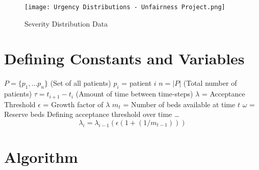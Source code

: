 \documentclass{article}
\begin{document}
\begin{figure}
    \centering
    \texttt{[image: Urgency Distributions - Unfairness Project.png]}
    \caption{Severity Distribution Data}
    \label{fig:enter-label}
\end{figure}

\section{Defining Constants and Variables }

$P = \{p_1, \dots p_n\}$ (Set of all patients)
\newline
\newline
$p_i$ = patient $i$
\newline
\newline
$n = |P|$ (Total number of patients)
\newline
\newline
$\tau =  t_{i+1} - t_i $ (Amount of time between time-steps)
\newline
\newline
$\lambda$ = Acceptance Threshold 
\newline
\newline
$\epsilon$ = Growth factor of $\lambda$
\newline
\newline
$m_t$ = Number of beds available at time $t$
\newline
\newline
$\omega$ = Reserve beds
\newline
\newline
Defining acceptance threshold over time \dots
\begin{equation}
    \lambda_i = \lambda_{i-1}(\epsilon(1 + (1 / m_{t-1})))
\end{equation}

\section{Algorithm}
\end{document}

